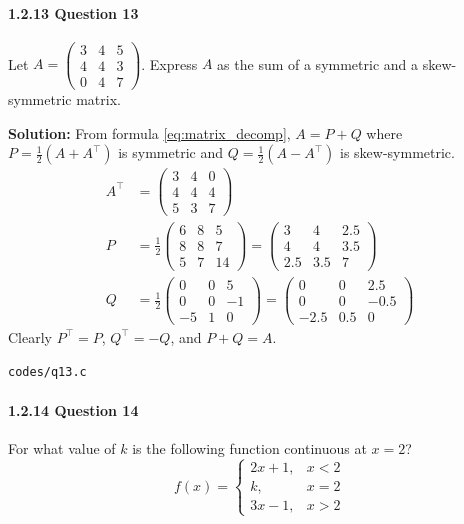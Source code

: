 \documentclass{article}
\begin{document}
\paragraph{1.2.13 Question 13}
Let $A = \begin{pmatrix} 3 & 4 & 5 \\ 4 & 4 & 3 \\ 0 & 4 & 7 \end{pmatrix}$. Express $A$ as the sum of a symmetric and a skew-symmetric matrix.

\textbf{Solution:} From formula \eqref{eq:matrix_decomp}, $A = P + Q$ where $P = \frac{1}{2}(A + A^\top)$ is symmetric and $Q = \frac{1}{2}(A - A^\top)$ is skew-symmetric.
\begin{align}
A^\top &= \begin{pmatrix} 3 & 4 & 0 \\ 4 & 4 & 4 \\ 5 & 3 & 7 \end{pmatrix} \\
P &= \frac{1}{2}\begin{pmatrix} 6 & 8 & 5 \\ 8 & 8 & 7 \\ 5 & 7 & 14 \end{pmatrix} = \begin{pmatrix} 3 & 4 & 2.5 \\ 4 & 4 & 3.5 \\ 2.5 & 3.5 & 7 \end{pmatrix} \\
Q &= \frac{1}{2}\begin{pmatrix} 0 & 0 & 5 \\ 0 & 0 & -1 \\ -5 & 1 & 0 \end{pmatrix} = \begin{pmatrix} 0 & 0 & 2.5 \\ 0 & 0 & -0.5 \\ -2.5 & 0.5 & 0 \end{pmatrix}
\end{align}
Clearly $P^\top = P$, $Q^\top = -Q$, and $P + Q = A$.
\begin{tcolorbox}[colback=gray!10,colframe=black,width=\linewidth]
\texttt{codes/q13.c}
\end{tcolorbox}

\paragraph{1.2.14 Question 14}
For what value of $k$ is the following function continuous at $x = 2$?
\begin{equation}
f(x) = \begin{cases} 2x + 1, & x < 2 \\ k, & x = 2 \\ 3x - 1, & x > 2 \end{cases}
\end{equation}
\end{document}
